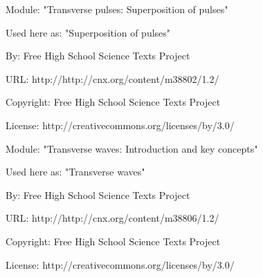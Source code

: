       \par\vspace{9pt}\noindent\begin{minipage}{\textwidth}
      Module: "Transverse pulses: Superposition of pulses" \par\nopagebreak\noindent
      Used here as: "Superposition of pulses" \par\nopagebreak\noindent
        By: Free High School Science Texts Project\par\nopagebreak\noindent
      URL: http://http://cnx.org/content/m38802/1.2/\par\nopagebreak\noindent
      \par\nopagebreak\noindent
      Copyright: Free High School Science Texts Project\par\nopagebreak\noindent
      License:  http://creativecommons.org/licenses/by/3.0/\par\nopagebreak\noindent
      \par\end{minipage}
      \par\vspace{9pt}\noindent\begin{minipage}{\textwidth}
      Module: "Transverse waves: Introduction and key concepts" \par\nopagebreak\noindent
      Used here as: "Transverse waves" \par\nopagebreak\noindent
        By: Free High School Science Texts Project\par\nopagebreak\noindent
      URL: http://http://cnx.org/content/m38806/1.2/\par\nopagebreak\noindent
      \par\nopagebreak\noindent
      Copyright: Free High School Science Texts Project\par\nopagebreak\noindent
      License:  http://creativecommons.org/licenses/by/3.0/\par\nopagebreak\noindent
      \par\end{minipage}
